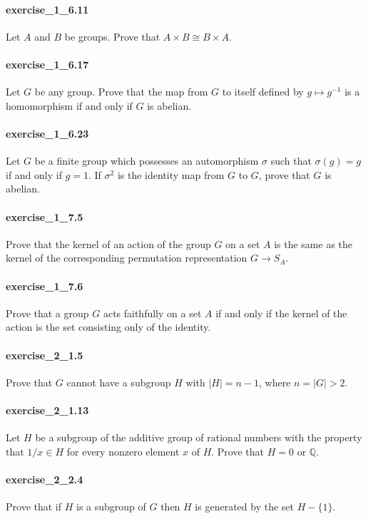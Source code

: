 \documentclass{article}
\begin{document}
\paragraph{exercise\_1\_6.11} Let $A$ and $B$ be groups. Prove that $A \times B \cong B \times A$.

\paragraph{exercise\_1\_6.17} Let $G$ be any group. Prove that the map from $G$ to itself defined by $g \mapsto g^{-1}$ is a homomorphism if and only if $G$ is abelian.

\paragraph{exercise\_1\_6.23} Let $G$ be a finite group which possesses an automorphism $\sigma$ such that $\sigma(g)=g$ if and only if $g=1$. If $\sigma^{2}$ is the identity map from $G$ to $G$, prove that $G$ is abelian.

\paragraph{exercise\_1\_7.5} Prove that the kernel of an action of the group $G$ on a set $A$ is the same as the kernel of the corresponding permutation representation $G\to S_A$.

\paragraph{exercise\_1\_7.6} Prove that a group $G$ acts faithfully on a set $A$ if and only if the kernel of the action is the set consisting only of the identity.

\paragraph{exercise\_2\_1.5} Prove that $G$ cannot have a subgroup $H$ with $|H|=n-1$, where $n=|G|>2$.

\paragraph{exercise\_2\_1.13} Let $H$ be a subgroup of the additive group of rational numbers with the property that $1 / x \in H$ for every nonzero element $x$ of $H$. Prove that $H=0$ or $\mathbb{Q}$.

\paragraph{exercise\_2\_2.4} Prove that if $H$ is a subgroup of $G$ then $H$ is generated by the set $H-\{1\}$.
\end{document}
